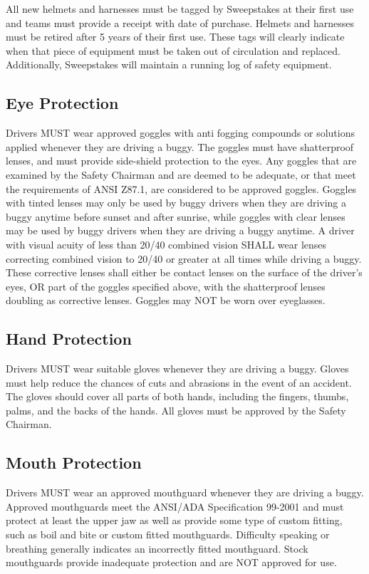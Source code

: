 	All new helmets and harnesses must be tagged by Sweepstakes at their first use and teams must provide a receipt with date of purchase. Helmets and harnesses must be retired after 5 years of their first use. These tags will clearly indicate when that piece of equipment must be taken out of circulation and replaced. Additionally, Sweepstakes will maintain a running log of safety equipment. 

\subsection{Eye Protection}

	Drivers MUST wear approved goggles with anti fogging compounds or solutions applied whenever they are driving a buggy. The goggles must have shatterproof lenses, and must provide side-shield protection to the eyes. Any goggles that are examined by the Safety Chairman and are deemed to be adequate, or that meet the requirements of ANSI Z87.1, are considered to be approved goggles. Goggles with tinted lenses may only be used by buggy drivers when they are driving a buggy anytime before sunset and after sunrise, while goggles with clear lenses may be used by buggy drivers when they are driving a buggy anytime. A driver with visual acuity of less than 20/40 combined vision SHALL wear lenses correcting combined vision to 20/40 or greater at all times while driving a buggy. These corrective lenses shall either be contact lenses on the surface of the driver’s eyes, OR part of the goggles specified above, with the shatterproof lenses doubling as corrective lenses. Goggles may NOT be worn over eyeglasses.


\subsection{Hand Protection}

	Drivers MUST wear suitable gloves whenever they are driving a buggy. Gloves must help reduce the chances of cuts and abrasions in the event of an accident. The gloves should cover all parts of both hands, including the fingers, thumbs, palms, and the backs of the hands. All gloves must be approved by the Safety Chairman.

\subsection{Mouth Protection}

	Drivers MUST wear an approved mouthguard whenever they are driving a buggy. Approved mouthguards meet the ANSI/ADA Specification 99-2001 and must protect at least the upper jaw as well as provide some type of custom fitting, such as boil and bite or custom fitted mouthguards. Difficulty speaking or breathing generally indicates an incorrectly fitted mouthguard. Stock mouthguards provide inadequate protection and are NOT approved for use.

